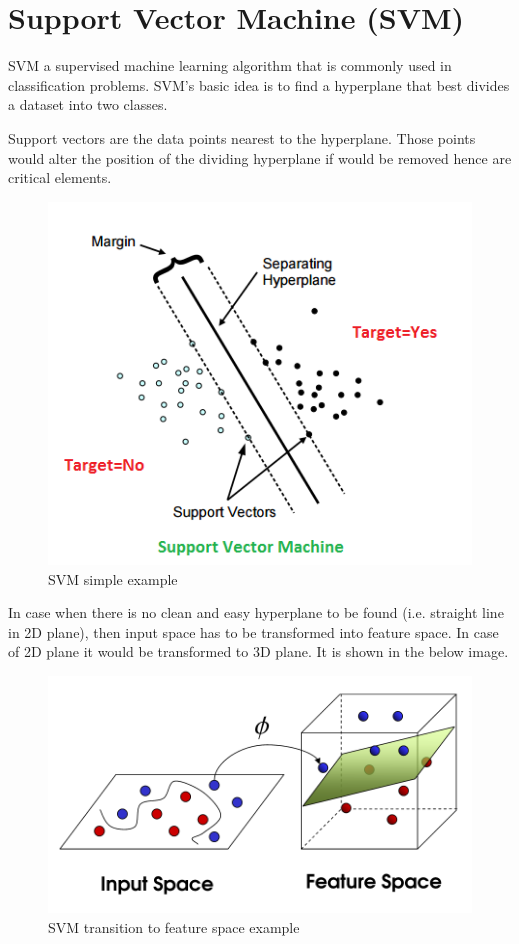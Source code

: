 \documentclass[a4paper, 11pt]{article}
\begin{document}
\section*{Support Vector Machine (SVM)}

SVM a supervised machine learning algorithm that is commonly used in classification problems. SVM's basic idea is to find a hyperplane that best divides a dataset into two classes.

Support vectors are the data points nearest to the hyperplane. Those points would alter the position of the dividing hyperplane if would be removed hence are critical elements.

\begin{figure}[!htbp]
\includegraphics[scale=0.8]{SVM-Planes.png}
\centering
\caption{SVM simple example}
\end{figure}


In case when there is no clean and easy hyperplane to be found (i.e. straight line in 2D plane), then input space has to be transformed into feature space. In case of 2D plane it would be transformed to 3D plane. It is shown in the below image.

\begin{figure}[!htbp]
\includegraphics[scale=0.3]{svm.png}
\centering
\caption{SVM transition to feature space example}
\end{figure}
\end{document}
